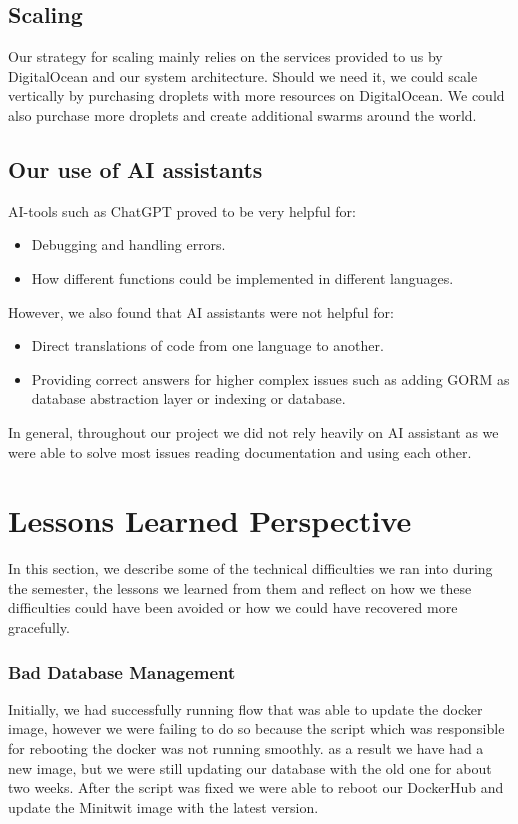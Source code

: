 \documentclass{article}
\begin{document}
\subsection{Scaling}
Our strategy for scaling mainly relies on the services provided to us by DigitalOcean and our system architecture. Should we need it, we could scale vertically by purchasing droplets with more resources on DigitalOcean. We could also purchase more droplets and create additional swarms around the world. 

\subsection{Our use of AI assistants}
AI-tools such as ChatGPT proved to be very helpful for:
\begin{itemize}
    \item Debugging and handling errors.
    \item How different functions could be implemented in different languages.
\end{itemize}
However, we also found that AI assistants were not helpful for:
\begin{itemize}
    \item Direct translations of code from one language to another.
    \item Providing correct answers for higher complex issues such as adding GORM as database abstraction layer or indexing or database.
\end{itemize}

In general, throughout our project we did not rely heavily on AI assistant as we were able to solve most issues reading documentation and using each other.

\section{Lessons Learned Perspective}
In this section, we describe some of the technical difficulties we ran into during the semester, the lessons we learned from them and reflect on how we these difficulties could have been avoided or how we could have recovered more gracefully.

\subsubsection{Bad Database Management}
Initially, we had successfully running flow that was able to update the docker image, however we were failing to do so because the script which was responsible for rebooting the docker was not running smoothly. as a result we have had a new image, but we were still updating our database with the old one for about two weeks. 
After the script was fixed we were able to reboot our DockerHub and update the Minitwit image with the latest version.
\end{document}
